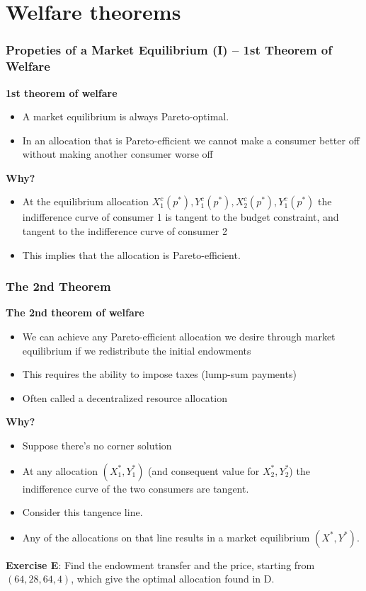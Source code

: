 \documentclass[handout]{beamer}
\newenvironment{iPar}[1]{\textbf{#1} \begin{itemize}}{\end{itemize}}
\newcommand{\mdp}{\medskip \pause}
\begin{document}
\section{Welfare theorems}

\begin{frame}\frametitle{Propeties of a Market Equilibrium (I) -- 1st Theorem of Welfare} \begin{iPar}{1st theorem of welfare} \item  A market equilibrium is always Pareto-optimal. \item 
In an allocation that is Pareto-efficient we cannot make a consumer better off without making another consumer worse off \end{iPar}\mdp



\begin{iPar}{Why?} \item<1-> At the equilibrium allocation
$X^c_1(p^*),Y^c_1(p^*),X^c_2(p^*),Y^c_1(p^*)$ the indifference curve of consumer 1 is tangent to the budget constraint, and tangent to the indifference curve of consumer 2 \item<2-> This implies that the allocation is Pareto-efficient.\end{iPar}

\end{frame}


\begin{frame}\frametitle{The 2nd Theorem}

\begin{iPar}{The 2nd theorem of welfare} \item We can achieve any Pareto-efficient allocation we desire through market equilibrium if we redistribute the initial endowments \item This requires the ability to impose taxes (lump-sum payments) \item Often called a decentralized resource allocation
\end{iPar}\mdp

\begin{iPar}{Why?}\item Suppose there's no corner solution \item At any allocation $(X_1^*,Y_1^*)$ (and consequent value for
$X_2^*,Y_2^*$) the indifference curve of the two consumers are tangent.
\item Consider this tangence line. \item Any of the allocations on that line results in a market equilibrium  $(X^*,Y^*)$. \end{iPar}

\textbf{Exercise E}: Find the endowment transfer and the price, starting from $(64,28,64,4)$, which give the optimal allocation found in D.  

\end{frame}
\end{document}
